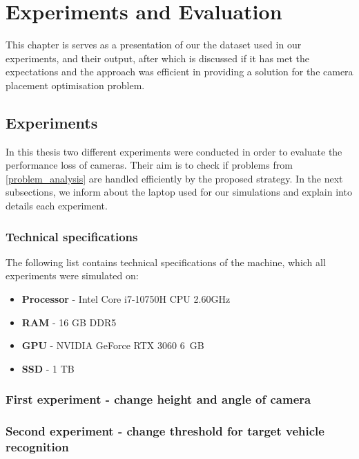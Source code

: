 \chapter{Experiments and Evaluation}
\label{evaluation}

This chapter is serves as a presentation of our the dataset used in our experiments, and their output, after which is discussed if it has met the expectations and the approach was efficient in providing a solution for the camera placement optimisation problem.

\section{Experiments}
In this thesis two different experiments were conducted in order to evaluate the performance loss of cameras. Their aim is to check if problems from \ref{problem_analysis} are handled efficiently by the proposed strategy. In the next subsections, we inform about the laptop used for our simulations and explain into details each experiment.

\subsection{Technical specifications}
The following list contains technical specifications of the machine, which all experiments were simulated on:
\begin{itemize}
    \item \textbf{Processor} - Intel Core i7-10750H CPU 2.60GHz
    \item \textbf{RAM} - 16 GB DDR5
    \item \textbf{GPU} - NVIDIA GeForce RTX 3060 6 GB
    \item \textbf{SSD} - 1 TB
\end{itemize}

\subsection{First experiment - change height and angle of camera}

\subsection{Second experiment - change threshold for target vehicle recognition}

